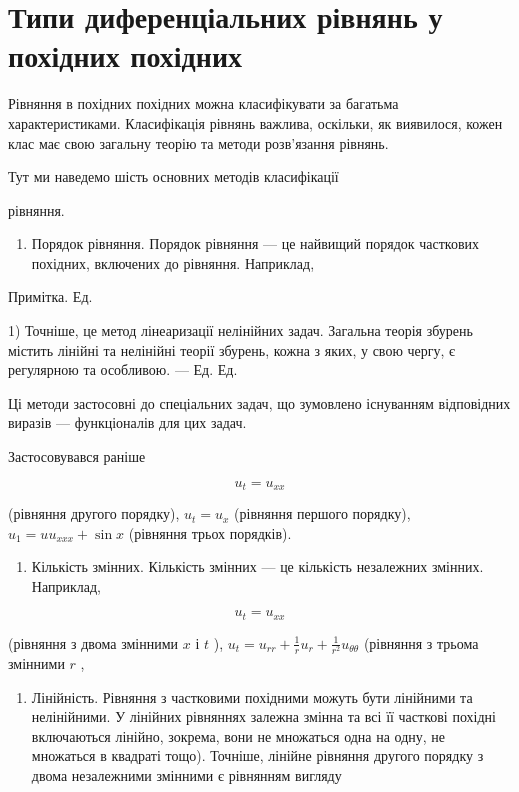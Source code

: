 \documentclass[
  ukrainian,
]{article}
\providecommand{\tightlist}{%
  \setlength{\itemsep}{0pt}\setlength{\parskip}{0pt}}
\begin{document}
\section{Типи диференціальних рівнянь у похідних
похідних}\label{ux442ux438ux43fux438-ux434ux438ux444ux435ux440ux435ux43dux446ux456ux430ux43bux44cux43dux438ux445-ux440ux456ux432ux43dux44fux43dux44c-ux443-ux43fux43eux445ux456ux434ux43dux438ux445-ux43fux43eux445ux456ux434ux43dux438ux445}

Рівняння в похідних похідних можна класифікувати за багатьма
характеристиками. Класифікація рівнянь важлива, оскільки, як виявилося,
кожен клас має свою загальну теорію та методи розв'язання рівнянь.

Тут ми наведемо шість основних методів класифікації

рівняння.

\begin{enumerate}
\def\labelenumi{\arabic{enumi}.}
\tightlist
\item
  Порядок рівняння. Порядок рівняння --- це найвищий порядок часткових
  похідних, включених до рівняння. Наприклад,
\end{enumerate}

Примітка. Ед.

1) Точніше, це метод лінеаризації нелінійних задач. Загальна теорія
збурень містить лінійні та нелінійні теорії збурень, кожна з яких, у
свою чергу, є регулярною та особливою. --- Ед. Ед.

Ці методи застосовні до спеціальних задач, що зумовлено існуванням
відповідних виразів --- функціоналів для цих задач.

Застосовувався раніше

\[
u_t = u_{xx}
\]

(рівняння другого порядку), \(u_t = u_x\) (рівняння першого порядку),
\(u_1 = uu_{xxx} + \sin x\) (рівняння трьох порядків).

\begin{enumerate}
\def\labelenumi{\arabic{enumi}.}
\setcounter{enumi}{1}
\tightlist
\item
  Кількість змінних. Кількість змінних --- це кількість незалежних
  змінних. Наприклад,
\end{enumerate}

\[
u_t = u_{xx}
\]

(рівняння з двома змінними \(x\) і \(t\) ),
\(u_t = u_{rr} + \frac{1}{r} u_r + \frac{1}{r^2} u_{\theta\theta}\)
(рівняння з трьома змінними \(r\) ,

\begin{enumerate}
\def\labelenumi{\arabic{enumi}.}
\setcounter{enumi}{2}
\tightlist
\item
  Лінійність. Рівняння з частковими похідними можуть бути лінійними та
  нелінійними. У лінійних рівняннях залежна змінна та всі її часткові
  похідні включаються лінійно, зокрема, вони не множаться одна на одну,
  не множаться в квадраті тощо). Точніше, лінійне рівняння другого
  порядку з двома незалежними змінними є рівнянням вигляду
\end{enumerate}
\end{document}
